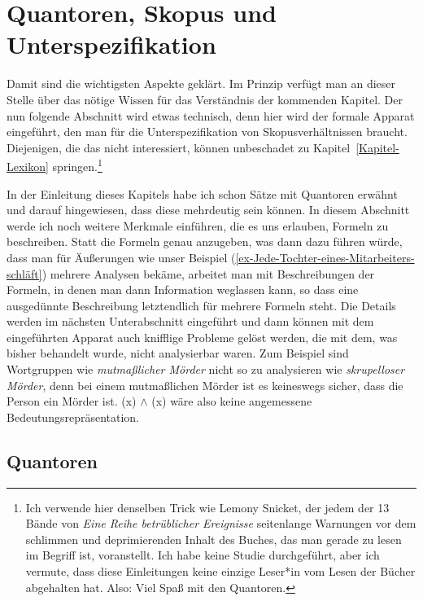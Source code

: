 \section{Quantoren, Skopus und Unterspezifikation}
\label{Abschnitt-Skopus}

Damit sind die wichtigsten Aspekte geklärt. Im Prinzip verfügt man an dieser Stelle über das nötige
Wissen für das Verständnis der kommenden Kapitel. Der nun folgende Abschnitt wird etwas technisch,
denn hier wird der formale Apparat eingeführt, den man für die Unterspezifikation von
Skopusverhältnissen braucht. Diejenigen, die das nicht interessiert, können unbeschadet zu
Kapitel~\ref{Kapitel-Lexikon} springen.\footnote{
  Ich verwende hier denselben Trick wie Lemony Snicket, der jedem der 13 Bände von \emph{Eine Reihe
    betrüblicher Ereignisse} seitenlange Warnungen vor dem schlimmen und deprimierenden Inhalt des
  Buches, das man gerade zu lesen im Begriff ist, voranstellt. Ich habe keine Studie durchgeführt,
  aber ich vermute, dass diese Einleitungen keine einzige Leser*in vom Lesen der Bücher abgehalten
  hat. Also: Viel Spaß mit den Quantoren.
}

In der Einleitung dieses Kapitels habe ich schon Sätze mit Quantoren erwähnt und darauf hingewiesen,
dass diese mehrdeutig sein können. In diesem Abschnitt werde ich noch weitere Merkmale einführen,
die es uns erlauben, Formeln zu beschreiben. Statt die Formeln genau anzugeben, was dann dazu führen
würde, dass man für Äußerungen wie unser Beispiel (\ref{ex-Jede-Tochter-eines-Mitarbeiters-schläft})
mehrere Analysen bekäme, arbeitet man mit Beschreibungen der Formeln, in denen man dann Information
weglassen kann, so dass eine ausgedünnte Beschreibung letztendlich für mehrere Formeln steht. Die Details
werden im nächsten Unterabschnitt eingeführt und dann können mit dem eingeführten Apparat auch
knifflige Probleme gelöst werden, die mit dem, was bisher behandelt wurde, nicht analysierbar waren. Zum
Beispiel sind Wortgruppen wie \emph{mutmaßlicher Mörder} nicht so zu analysieren wie
\emph{skrupelloser Mörder}, denn bei einem mutmaßlichen Mörder ist es keineswegs sicher, dass die
Person ein Mörder ist. (x) $\wedge$ (x) wäre also keine
angemessene Bedeutungsrepräsentation. 

\subsection{Quantoren}
\label{Abschnitt-Quantoren}

